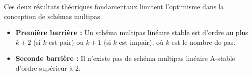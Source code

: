 \begin{theorem}
    Ces deux résultats théoriques fondamentaux limitent l'optimisme dans la conception de schémas multipas.
    \begin{itemize}
        \item \textbf{Première barrière :} Un schéma multipas linéaire stable est d'ordre au plus $k+2$ (si $k$ est pair) ou $k+1$ (si $k$ est impair), où $k$ est le nombre de pas.
        \item \textbf{Seconde barrière :} Il n'existe pas de schéma multipas linéaire A-stable d'ordre supérieur à 2.
    \end{itemize}
\end{theorem}